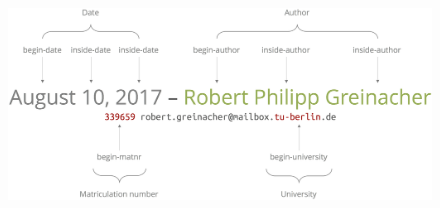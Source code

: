 \begin{titlepage}
	\begin{figure}[H]
		\centering
		\includegraphics[width=14.5cm]{assets/tagged-author.png}
	\end{figure}

	\vfill
	\begin{minipage}{1\textwidth}
		\Large\thechair
	\end{minipage}\\[1cm]
	\begin{minipage}{1\textwidth}
		\Large\thesupervisor
	\end{minipage}

\end{titlepage}
